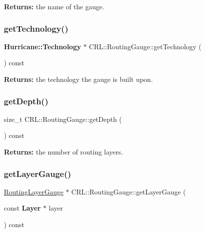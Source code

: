{\bfseries Returns\+:} the name of the gauge. \mbox{\label{classCRL_1_1RoutingGauge_a34cb010c6d36875f4890bddc78fb8861}} 
\subsubsection{\texorpdfstring{get\+Technology()}{getTechnology()}}
{\footnotesize\ttfamily \textbf{ Hurricane\+::\+Technology} $\ast$ C\+R\+L\+::\+Routing\+Gauge\+::get\+Technology (\begin{DoxyParamCaption}{ }\end{DoxyParamCaption}) const\hspace{0.3cm}{\ttfamily [inline]}}

{\bfseries Returns\+:} the technology the gauge is built upon. \mbox{\label{classCRL_1_1RoutingGauge_aed316848ee74c270bf117562e8d5faa0}} 
\subsubsection{\texorpdfstring{get\+Depth()}{getDepth()}}
{\footnotesize\ttfamily size\+\_\+t C\+R\+L\+::\+Routing\+Gauge\+::get\+Depth (\begin{DoxyParamCaption}{ }\end{DoxyParamCaption}) const\hspace{0.3cm}{\ttfamily [inline]}}

{\bfseries Returns\+:} the number of routing layers. \mbox{\label{classCRL_1_1RoutingGauge_aa0f0e65f45814ba0104daafbc271a12d}} 
\subsubsection{\texorpdfstring{get\+Layer\+Gauge()}{getLayerGauge()}\hspace{0.1cm}{\footnotesize\ttfamily [1/2]}}
{\footnotesize\ttfamily \mbox{\hyperlink{classCRL_1_1RoutingLayerGauge}{Routing\+Layer\+Gauge}} $\ast$ C\+R\+L\+::\+Routing\+Gauge\+::get\+Layer\+Gauge (\begin{DoxyParamCaption}\item[{const \textbf{ Layer} $\ast$}]{layer }\end{DoxyParamCaption}) const}

